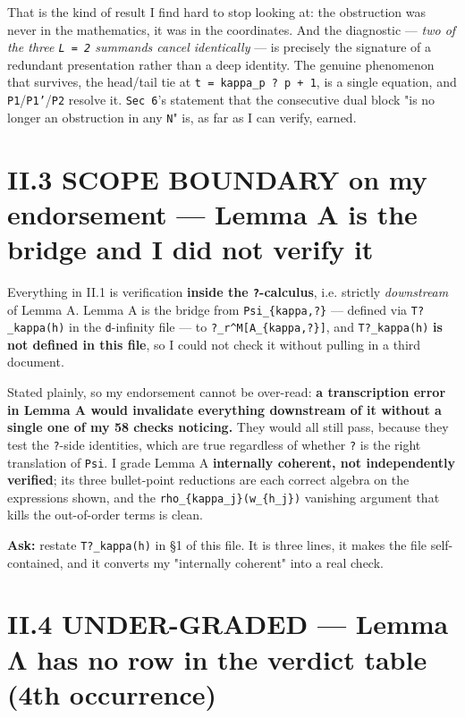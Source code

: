\documentclass[11pt,a4paper]{article}
\begin{document}
That is the kind of result I find hard to stop looking at: the obstruction was never in the mathematics, it was in the coordinates. And the diagnostic --- \emph{two of the three \mbox{\texttt{L = 2}} summands cancel identically} --- is precisely the signature of a redundant presentation rather than a deep identity. The genuine phenomenon that survives, the head/tail tie at \mbox{\texttt{t = kappa\_p ? p + 1}}, is a single equation, and \mbox{\texttt{P1}}/\mbox{\texttt{P1'}}/\mbox{\texttt{P2}} resolve it. \mbox{\texttt{Sec 6}}'s statement that the consecutive dual block "is no longer an obstruction in any \mbox{\texttt{N}}" is, as far as I can verify, earned.

\section*{II.3 SCOPE BOUNDARY on my endorsement --- Lemma A is the bridge and I did not verify it}

Everything in II.1 is verification \textbf{inside the \mbox{\texttt{?}}-calculus}, i.e. strictly \emph{downstream} of Lemma A. Lemma A is the bridge from \mbox{\texttt{Psi\_\{kappa,?\}}} --- defined via \mbox{\texttt{T?\_kappa(h)}} in the \mbox{\texttt{d}}-infinity file --- to \mbox{\texttt{?\_r\textasciicircum{}M[A\_\{kappa,?\}]}}, and \mbox{\texttt{T?\_kappa(h)}} \textbf{is not defined in this file}, so I could not check it without pulling in a third document.

Stated plainly, so my endorsement cannot be over-read: \textbf{a transcription error in Lemma A would invalidate everything downstream of it without a single one of my 58 checks noticing.} They would all still pass, because they test the \mbox{\texttt{?}}-side identities, which are true regardless of whether \mbox{\texttt{?}} is the right translation of \mbox{\texttt{Psi}}. I grade Lemma A \textbf{internally coherent, not independently verified}; its three bullet-point reductions are each correct algebra on the expressions shown, and the \mbox{\texttt{rho\_\{kappa\_j\}(w\_\{h\_j\})}} vanishing argument that kills the out-of-order terms is clean.

\textbf{Ask:} restate \mbox{\texttt{T?\_kappa(h)}} in \S{}1 of this file. It is three lines, it makes the file self-contained, and it converts my "internally coherent" into a real check.

\section*{II.4 UNDER-GRADED --- Lemma Λ has no row in the verdict table (4th occurrence)}
\end{document}
